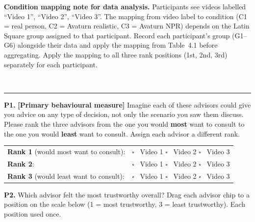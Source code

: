 \documentclass[11pt, a4paper]{article}
\newcommand{\qsection}[1]{%
  \vspace{6pt}
  \noindent{\sffamily\small\bfseries\color{konstanzblue} #1}\\[2pt]
  \noindent\rule{\linewidth}{0.3pt}
  \vspace{4pt}
}
\begin{document}
\begin{warnbox}
\small\textbf{Condition mapping note for data analysis.} Participants see videos labelled ``Video 1'', ``Video 2'', ``Video 3''. The mapping from video label to condition (C1 = real person, C2 = Avaturn realistic, C3 = Avaturn NPR) depends on the Latin Square group assigned to that participant. Record each participant's group (G1--G6) alongside their data and apply the mapping from Table~4.1 before aggregating. Apply the mapping to all three rank positions (1st, 2nd, 3rd) separately for each participant.
\end{warnbox}

\vspace{10pt}

\qsection{Comparative Preference}

\noindent\textbf{P1.} \textbf{[Primary behavioural measure]} Imagine each of these advisors could give you advice on any type of decision, not only the scenario you saw them discuss. Please rank the three advisors from the one you would \textbf{most} want to consult to the one you would \textbf{least} want to consult. Assign each advisor a different rank.\\[8pt]
\begin{tabular}{@{}lp{8cm}@{}}
  \textbf{Rank 1} (would most want to consult): & $\square$ \ Video 1 \quad $\square$ \ Video 2 \quad $\square$ \ Video 3 \\[6pt]
  \textbf{Rank 2}: & $\square$ \ Video 1 \quad $\square$ \ Video 2 \quad $\square$ \ Video 3 \\[6pt]
  \textbf{Rank 3} (would least want to consult): & $\square$ \ Video 1 \quad $\square$ \ Video 2 \quad $\square$ \ Video 3 \\
\end{tabular}

\vspace{10pt}
\noindent\textbf{P2.} Which advisor felt the most trustworthy overall? Drag each advisor chip to a position on the scale below (1 = most trustworthy, 3 = least trustworthy). Each position used once.\\[8pt]
\end{document}

